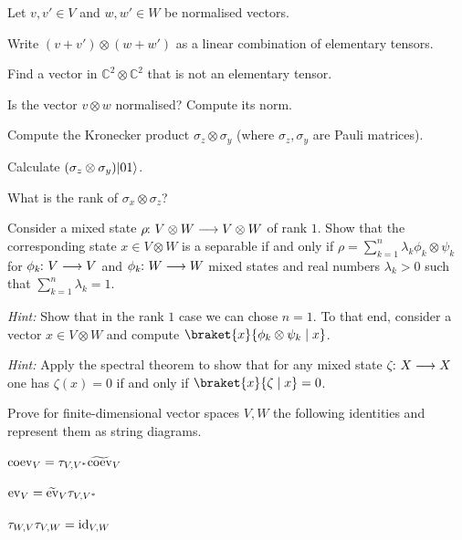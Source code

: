 \documentclass[a4paper, oneside, 12pt]{amsart}
\begin{document}
\begin{exercise}
  Let \(v, v' \in V\) and \(w, w'\in W\) be normalised vectors.
  \begin{thmlist}
    \item Write \((v + v') \otimes (w + w')\) as a linear combination of elementary tensors.
    \item Find a vector in \( \mathbb{C}^{2} \otimes \mathbb{C}^{2}\) that is not an elementary tensor.
    \item Is the vector \(v \otimes w\) normalised?
    Compute its norm.
    \item Compute the Kronecker product \(\sigma_{z} \otimes \sigma_{y}\) (where \(\sigma_{z}, \sigma_{y}\) are Pauli matrices).
    \item Calculate \((\sigma_{z} \otimes \sigma_{y}) \lvert01\rangle\).
    \item What is the rank of \(\sigma_{x}\otimes \sigma_{z}\)?
  \end{thmlist}
\end{exercise}

\begin{exercise}
  Consider a mixed state \(\rho \from V\otimes W \to V\otimes W\) of rank \(1\).
  Show that the corresponding state \(x \in V\otimes W\) is a separable if and only if \(\rho = \sum_{k=1}^{n} \lambda_{k} \phi_{k} \otimes \psi_{k}\) for \(\phi_{k} \from V\to V\) and \(\phi_{k} \from W\to W\) mixed states and real numbers \(\lambda_{k} > 0\) such that \(\sum_{k=1}^{n}\lambda_{k} =1\).

  \textit{Hint:} Show that in the rank \(1\) case we can chose \(n=1\).
  To that end, consider a vector \(x \in V\otimes W\) and compute
  \(\braket{x}{\phi_{k} \otimes \psi_{k} \mid x}\).

  \textit{Hint:} Apply the spectral theorem to show that for any mixed state \(\zeta \from X \to X\) one has \(\zeta(x) = 0\) if and only if \(\braket{x}{\zeta \mid x} = 0\).
\end{exercise}

\begin{exercise}
  Prove for  finite-dimensional vector spaces \(V, W\)  the following identities and represent them as string diagrams.
  \begin{thmlist}
    \item \(\coev_{V} = \tau_{V,\rd*{V}}\widetilde{\coev}_{V}\)
    \item \(\ev_{V} = \widetilde{\ev}_{V}\tau_{V,\rd*{V}}\)
    \item \(\tau_{W,V}\tau_{V,W} = \mathrm{id}_{V,W}\)
  \end{thmlist}
\end{exercise}
\end{document}
